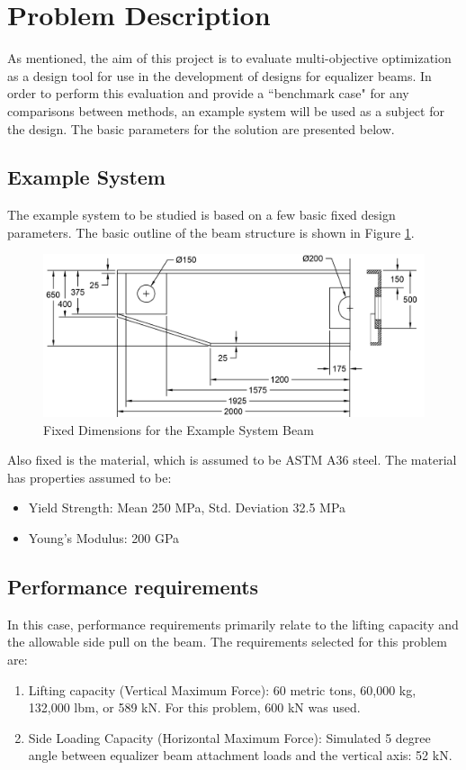 \section{Problem Description}
As mentioned, the aim of this project is to evaluate multi-objective optimization as a design tool for use in the development of designs for equalizer beams. In order to perform this evaluation and provide a ``benchmark case" for any comparisons between methods, an example system will be used as a subject for the design. The basic parameters for the solution are presented below. 

\subsection{Example System}
\label{sec:beam_des}
The example system to be studied is based on a few basic fixed design parameters. The basic outline of the beam structure is shown in Figure \ref{img:dim_beam}. 

\begin{figure}
\includegraphics[width=\textwidth]{img/dim_beam.png}
	\caption{Fixed Dimensions for the Example System Beam}
	\label{img:dim_beam}
\end{figure}

Also fixed is the material, which is assumed to be ASTM A36 steel. The material has properties assumed to be: 

\begin{itemize}
\item Yield Strength: Mean 250 MPa, Std. Deviation 32.5 MPa
\item Young's Modulus: 200 GPa
\end{itemize}

\subsection{Performance requirements}
\label{sec:perf_req}
In this case, performance requirements primarily relate to the lifting capacity and the allowable side pull on the beam. The requirements selected for this problem are: 
\begin{enumerate}
	\item Lifting capacity (Vertical Maximum Force): 60 metric tons, 60,000 kg, 132,000 lbm, or 589 kN. For this problem, 600 kN was used. 
	\item Side Loading Capacity (Horizontal Maximum Force):  Simulated 5 degree angle between equalizer beam attachment loads and the vertical axis: 52 kN. 
\end{enumerate}


